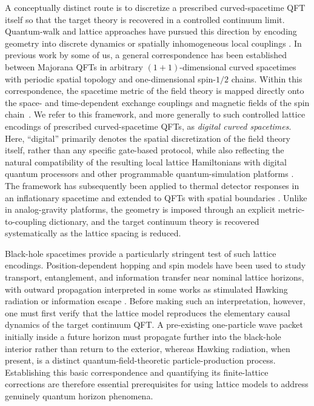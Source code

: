 \documentclass[reprint,amsmath,amssymb,aps,showkeys,superscriptaddress]{revtex4-2}
\begin{document}
A conceptually distinct route is to discretize a prescribed curved-spacetime QFT itself so that the target theory is recovered in a controlled continuum limit. Quantum-walk and lattice approaches have pursued this direction by encoding geometry into discrete dynamics or spatially inhomogeneous local couplings \cite{DiMolfetta2013,Yang2020,LewisVidal2020}. In previous work by some of us, a general correspondence has been established between Majorana QFTs in arbitrary $(1+1)$-dimensional curved spacetimes with periodic spatial topology and one-dimensional spin-$1/2$ chains. Within this correspondence, the spacetime metric of the field theory is mapped directly onto the space- and time-dependent exchange couplings and magnetic fields of the spin chain~\cite{Kinoshita2025}. We refer to this framework, and more generally to such controlled lattice encodings of prescribed curved-spacetime QFTs, as \emph{digital curved spacetimes}. Here, ``digital'' primarily denotes the spatial discretization of the field theory itself, rather than any specific gate-based protocol, while also reflecting the natural compatibility of the resulting local lattice Hamiltonians with digital quantum processors and other programmable quantum-simulation platforms \cite{Altman2021}. The framework has subsequently been applied to thermal detector responses in an inflationary spacetime and extended to QFTs with spatial boundaries \cite{KinoshitaInflation2025,KinoshitaBoundary2026}. Unlike in analog-gravity platforms, the geometry is imposed through an explicit metric-to-coupling dictionary, and the target continuum theory is recovered systematically as the lattice spacing is reduced.

Black-hole spacetimes provide a particularly stringent test of such lattice encodings. Position-dependent hopping and spin models have been used to study transport, entanglement, and information transfer near nominal lattice horizons, with outward propagation interpreted in some works as stimulated Hawking radiation or information escape \cite{Yang2020,Shi2023,Benhemou2023,Liu2026}. Before making such an interpretation, however, one must first verify that the lattice model reproduces the elementary causal dynamics of the target continuum QFT. A pre-existing one-particle wave packet initially inside a future horizon must propagate further into the black-hole interior rather than return to the exterior, whereas Hawking radiation, when present, is a distinct quantum-field-theoretic particle-production process. Establishing this basic correspondence and quantifying its finite-lattice corrections are therefore essential prerequisites for using lattice models to address genuinely quantum horizon phenomena.
\end{document}
